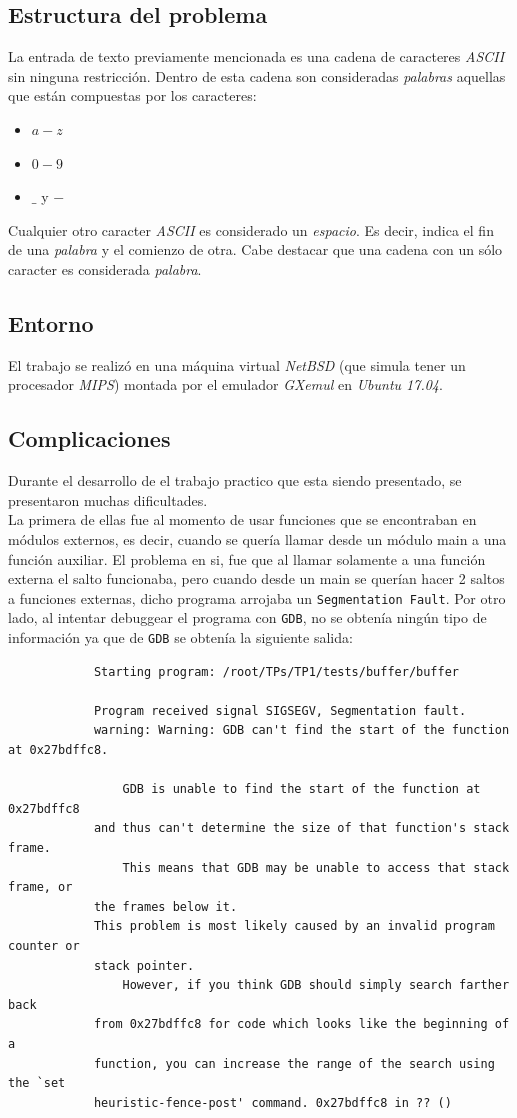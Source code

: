 \documentclass[a4paper, 10pt]{article}
\def\code#1{\texttt{#1}}
\newcommand\tab[1][0.5cm]{\hspace*{#1}}
\begin{document}
		\subsection{Estructura del problema}
			La entrada de texto previamente mencionada es una cadena de caracteres \emph{ASCII}
			sin ninguna restricción. Dentro de esta cadena son consideradas \emph{palabras} aquellas
			que están compuestas por los caracteres:
			\begin{itemize}
				\item $a-z$
				\item $0-9$
				\item $\_$ y $-$
			\end{itemize}
			\tab Cualquier otro caracter \emph{ASCII} es considerado un \emph{espacio}. Es decir,
			indica el fin de una \emph{palabra} y el comienzo de otra. Cabe destacar que una cadena
			con un sólo caracter es considerada \emph{palabra}.
		\subsection{Entorno}
			El trabajo se realizó en una máquina virtual \emph{NetBSD} (que simula tener un procesador
			\emph{MIPS}) montada por el emulador \emph{GXemul} en \emph{Ubuntu 17.04}.
		\subsection{Complicaciones}
			
			Durante el desarrollo de el trabajo practico que esta siendo presentado, se presentaron muchas dificultades. \\
			\tab La primera de ellas fue al momento de usar funciones que se encontraban en módulos externos, es decir, cuando se quería llamar desde un módulo main a una función auxiliar. El problema en si, fue que al llamar solamente a una función externa el salto funcionaba, pero cuando desde un main se querían hacer 2 saltos a funciones externas, dicho programa arrojaba un \code{Segmentation Fault}. Por otro lado, al intentar debuggear el programa con \code{GDB}, no se obtenía ningún tipo de información ya que de \code{GDB} se obtenía la siguiente salida:
			
		\begin{verbatim}
			Starting program: /root/TPs/TP1/tests/buffer/buffer

			Program received signal SIGSEGV, Segmentation fault.
			warning: Warning: GDB can't find the start of the function at 0x27bdffc8.

   				GDB is unable to find the start of the function at 0x27bdffc8
			and thus can't determine the size of that function's stack frame.
				This means that GDB may be unable to access that stack frame, or
			the frames below it.
    		This problem is most likely caused by an invalid program counter or
			stack pointer.
    			However, if you think GDB should simply search farther back
			from 0x27bdffc8 for code which looks like the beginning of a
			function, you can increase the range of the search using the `set
			heuristic-fence-post' command. 0x27bdffc8 in ?? ()
		\end{verbatim}
		
\end{document}
